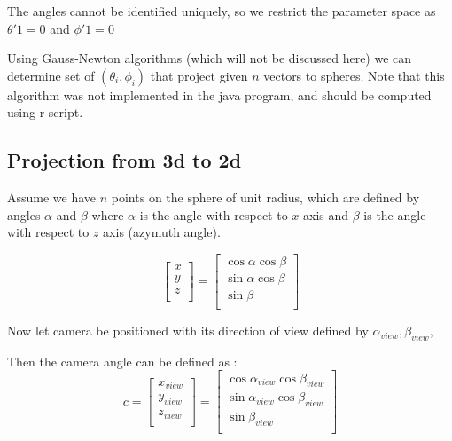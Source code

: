 \documentclass[]{article}
\begin{document}
The angles cannot be identified uniquely, so we restrict the parameter space as $\theta' 1 = 0$ and $\phi ' 1=0$

Using Gauss-Newton algorithms (which will not be discussed here) we can determine set of $(\theta_i,\phi_i)$ that project given $n$ vectors to spheres. Note that this algorithm was not implemented in the java program, and should be computed using r-script.


\subsection{Projection from 3d to 2d}
Assume we have $n$ points on the sphere of unit radius, which are defined by angles $\alpha$ and $\beta$ where $\alpha$ is the angle with respect to $x$ axis and $\beta$ is the angle with respect to $z$ axis (azymuth angle).

\begin{equation}
\left[ \begin{array}{c}
x \\ y \\ z \\ \end{array}\right]
=
\left[ \begin{array}{c}
\cos \alpha \cos \beta \\ 
\sin \alpha \cos \beta \\ 
\sin \beta \\ \end{array}\right]
\end{equation} \label{eq1}

Now let camera be positioned with its direction of view defined by $\alpha_{view},\beta_{view},$

Then the camera angle can be defined as : 
\begin{equation}
c=\left[\begin{array}{c}
x_{view} \\ y_{view} \\ z_{view} \\ \end{array}\right]
=
\left[ \begin{array}{c}
\cos \alpha_{view} \cos \beta_{view} \\ 
\sin \alpha_{view} \cos \beta_{view} \\ 
\sin \beta_{view} \\ \end{array}\right]
\end{equation} \label{eq2}
\end{document}
